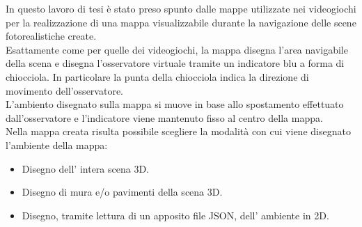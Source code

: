 In questo lavoro di tesi è stato preso spunto dalle mappe utilizzate nei videogiochi per la realizzazione di una mappa visualizzabile durante la navigazione delle scene fotorealistiche create.
\\
Esattamente come per quelle dei videogiochi, la mappa disegna l’area navigabile della scena e disegna l’osservatore virtuale tramite un indicatore blu a forma di chiocciola. In particolare la punta della chiocciola indica la direzione di movimento dell’osservatore.
\\
L’ambiento disegnato sulla mappa si muove in base allo spostamento effettuato dall’osservatore e l’indicatore viene mantenuto fisso al centro della mappa.
\\

Nella mappa creata risulta possibile scegliere la modalità con cui viene disegnato l’ambiente della mappa:
\begin{itemize}
\item Disegno dell’ intera scena 3D.
\item Disegno di mura e/o pavimenti della scena 3D.
\item Disegno, tramite lettura di un apposito file JSON, dell’ ambiente in 2D.
\end{itemize}

